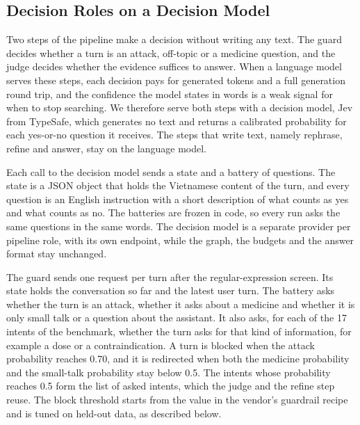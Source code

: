 
\subsection{Decision Roles on a Decision Model}\label{sec:decision}

Two steps of the pipeline make a decision without writing any text. The guard decides whether a turn is an attack, off-topic or a medicine question, and the judge decides whether the evidence suffices to answer. When a language model serves these steps, each decision pays for generated tokens and a full generation round trip, and the confidence the model states in words is a weak signal for when to stop searching. %
We therefore serve both steps with a decision model, Jev from TypeSafe, which generates no text and returns a calibrated probability for each yes-or-no question it receives. %
The steps that write text, namely rephrase, refine and answer, stay on the language model.

Each call to the decision model sends a state and a battery of questions. The state is a JSON object that holds the Vietnamese content of the turn, and every question is an English instruction with a short description of what counts as yes and what counts as no. The batteries are frozen in code, so every run asks the same questions in the same words. The decision model is a separate provider per pipeline role, with its own endpoint, while the graph, the budgets and the answer format stay unchanged.

The guard sends one request per turn after the regular-expression screen. Its state holds the conversation so far and the latest user turn. The battery asks whether the turn is an attack, whether it asks about a medicine and whether it is only small talk or a question about the assistant. It also asks, for each of the 17 intents of the benchmark, whether the turn asks for that kind of information, for example a dose or a contraindication. A turn is blocked when the attack probability reaches 0.70, and it is redirected when both the medicine probability and the small-talk probability stay below 0.5. The intents whose probability reaches 0.5 form the list of asked intents, which the judge and the refine step reuse. The block threshold starts from the value in the vendor's guardrail recipe and is tuned on held-out data, as described below.

